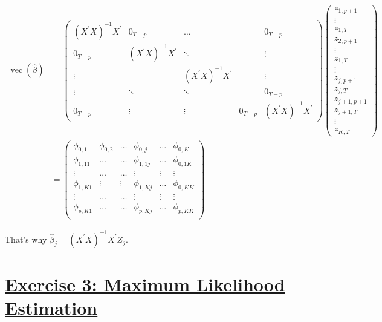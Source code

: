 \documentclass[12pt,a4paper]{article}
\renewcommand{\vec}{\operatorname{vec}}
\newcommand{\tmpsection}[1]{}
\let\tmpsection=\section
\renewcommand{\section}[1]{\tmpsection{\underline{#1}} }
\begin{document}
\begin{align*}
  \vec \left( \widehat{\beta} \right) & = 
  \begin{pmatrix}
  \left( X^{'} X \right)^{-1} X^{'} & 0_{T- p} & \ldots & &  0_{T- p}\\
  0_{T- p} &  \left( X^{'} X \right)^{-1} X^{'} & \ddots & & \vdots \\
  \vdots &  &  \left( X^{'} X \right)^{-1} X^{'} &  &\vdots \\
   \vdots & \ddots  &  \ddots &  & 0_{T-p} \\
   0_{T-p} & \vdots & \vdots  & 0_{T-p} &\left( X^{'} X \right)^{-1} X^{'}
  \end{pmatrix}
  \begin{pmatrix}
  z_{1,p+1}\\
  \vdots \\
  z_{1,T}\\
  z_{2,p+1}\\
  \vdots\\
  z_{1,T}\\
  \vdots\\
  z_{j,p+1}\\
  z_{j,T}\\
  z_{j+1,p+1}\\
  z_{j+1,T}\\
  \vdots\\
  z_{K,T}
  \end{pmatrix}\\
 &  = \begin{pmatrix}
  \phi_{0,1 } & \phi_{0,2} & \ldots & \phi_{0,j}  & \ldots & \phi_{0,K}\\
  \phi_{1,11} & \ldots     & \ldots & \phi_{1,1j} & \ldots & \phi_{0,1K}\\
  \vdots      & \ldots     & \ldots & \vdots      & \vdots & \vdots\\
  \phi_{1,K1} & \vdots     & \vdots & \phi_{1,Kj} & \ldots & \phi_{0,KK}\\
  \vdots      & \ldots     & \ldots & \vdots      & \vdots & \vdots\\
  \phi_{p,K1} & \ldots     & \ldots & \phi_{p,Kj} & \ldots & \phi_{p,KK}\\
  \end{pmatrix}
\end{align*}

That's why
\(\widehat{\beta}_j = \left( X^{'} X \right)^{-1} X^{'} Z_j\).

\hypertarget{exercise-3-maximum-likelihood-estimation}{%
\section{Exercise 3: Maximum Likelihood
Estimation}\label{exercise-3-maximum-likelihood-estimation}}
\end{document}
